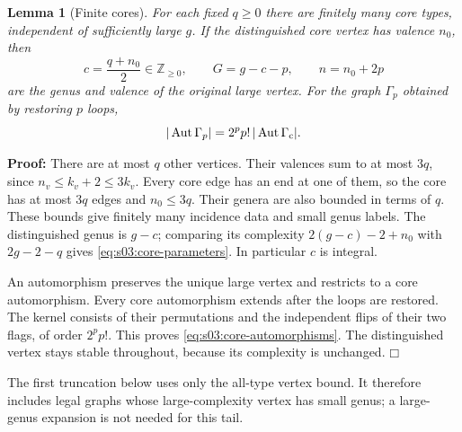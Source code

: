 \documentclass[a4paper,10pt]{article}
\numberwithin{equation}{section}
\theoremstyle{paperplain}
\newtheorem{lmm}[thm]{Lemma}
\theoremstyle{paperremark}
\theoremstyle{paperplain}
\newenvironment{prf}{\noindent \textbf{Proof: }}{\hfill $\mdlgwhtsquare$\par\addvspace{0.5\baselineskip}}
\begin{document}
\begin{lmm}[Finite cores]
\label{lmm:s03:finite-cores}
For each fixed $q\geq0$ there are finitely many core types,
independent of sufficiently large $g$. If the distinguished core
vertex has valence $n_0$, then
\begin{equation}
\label{eq:s03:core-parameters}
c=\frac{q+n_0}{2}\in\mathbb Z_{\geq0},\qquad
G=g-c-p,\qquad n=n_0+2p
\end{equation}
are the genus and valence of the original large vertex.
For the graph $\Gamma_p$ obtained by restoring $p$ loops,
\begin{equation}
\label{eq:s03:core-automorphisms}
|\operatorname{Aut}\Gamma_p|
=2^pp!\,|\operatorname{Aut}\Gamma_{\rm c}|.
\end{equation}
\end{lmm}
\begin{prf}
There are at most $q$ other vertices. Their valences sum to at most
$3q$, since $n_v\leq k_v+2\leq3k_v$.
Every core edge has an end at one of them, so the core has at most
$3q$ edges and $n_0\leq3q$. Their genera are also bounded in terms
of $q$. These bounds give finitely many incidence data and small
genus labels. The distinguished genus is $g-c$; comparing its
complexity $2(g-c)-2+n_0$ with $2g-2-q$ gives
\eqref{eq:s03:core-parameters}. In particular $c$ is integral.

An automorphism preserves the unique large vertex and restricts to
a core automorphism. Every core automorphism extends after the loops
are restored. The kernel consists of their permutations and the
independent flips of their two flags, of order $2^pp!$.
This proves \eqref{eq:s03:core-automorphisms}. The distinguished
vertex stays stable throughout, because its complexity is unchanged.
\end{prf}

The first truncation below uses only the all-type vertex bound. It
therefore includes legal graphs whose large-complexity vertex has
small genus; a large-genus expansion is not needed for this tail.
\end{document}

